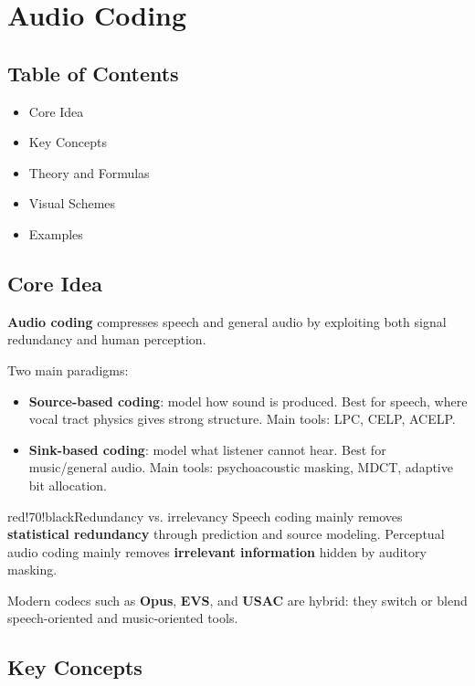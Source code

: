 \chapter{Audio Coding}

\section{Table of Contents}

\begin{itemize}
  \item Core Idea
  \item Key Concepts
  \item Theory and Formulas
  \item Visual Schemes
  \item Examples
\end{itemize}

\section{Core Idea}

\textbf{Audio coding} compresses speech and general audio by exploiting both signal redundancy and human perception.

Two main paradigms:

\begin{itemize}
  \item \textbf{Source-based coding}: model how sound is produced. Best for speech, where vocal tract physics gives strong structure. Main tools: LPC, CELP, ACELP.
  \item \textbf{Sink-based coding}: model what listener cannot hear. Best for music/general audio. Main tools: psychoacoustic masking, MDCT, adaptive bit allocation.
\end{itemize}

\begin{calloutbox}{red!70!black}{Redundancy vs. irrelevancy}
Speech coding mainly removes \textbf{statistical redundancy} through prediction and source modeling. Perceptual audio coding mainly removes \textbf{irrelevant information} hidden by auditory masking.
\end{calloutbox}

Modern codecs such as \textbf{Opus}, \textbf{EVS}, and \textbf{USAC} are hybrid: they switch or blend speech-oriented and music-oriented tools.

\section{Key Concepts}

